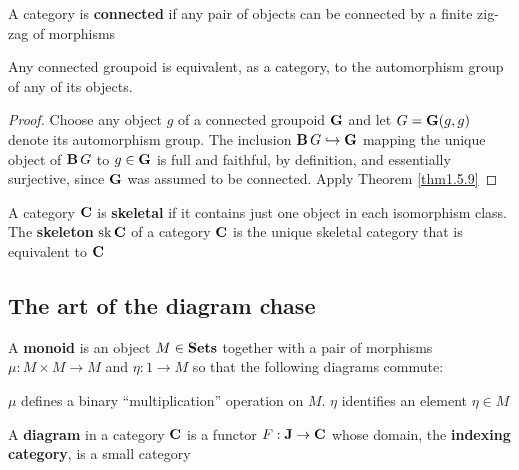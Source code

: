 \documentclass[11pt]{article}
\def \sk {\text{sk}}
\begin{document}
A category is \textbf{connected} if any pair of objects can be connected by a finite zig-zag of morphisms

\begin{proposition}[]
Any connected groupoid is equivalent, as a category, to the automorphism group of any of its objects.
\end{proposition}

\begin{proof}
Choose any object \(g\) of a connected groupoid \(\operatorname{\textbf{G}}\) and let \(G=\operatorname{\textbf{G}}(g,g)\) denote its
automorphism group. The inclusion \(\operatorname{\textbf{B}} G\hookrightarrow\operatorname{\textbf{G}}\) mapping the unique object of \(\operatorname{\textbf{B}} G\) to \(g\in\operatorname{\textbf{G}}\) is
full and faithful, by definition, and essentially surjective, since \(\operatorname{\textbf{G}}\) was assumed to be
connected. Apply Theorem \ref{thm1.5.9}
\end{proof}

\begin{definition}[]
A category \(\operatorname{\textbf{C}}\) is \textbf{skeletal} if it contains just one object in each isomorphism class. The
\textbf{skeleton} \(\sk\bC\) of a category \(\operatorname{\textbf{C}}\) is the unique skeletal category that is equivalent to \(\operatorname{\textbf{C}}\)
\end{definition}
\subsection{The art of the diagram chase}
\label{sec:orgbd3573c}
\begin{definition}[]
A \textbf{monoid} is an object \(M\in\operatorname{\textbf{Sets}}\) together with a pair of morphisms \(\mu:M\times M\to M\) and \(\eta:1\to M\)
so that the following diagrams commute:
\begin{center}\quad
{}
\end{center}
\end{definition}

\(\mu\) defines a binary ``multiplication'' operation on \(M\). \(\eta\) identifies an element \(\eta\in M\)

\begin{definition}[]
A \textbf{diagram} in a category \(\operatorname{\textbf{C}}\) is a functor \(F:\operatorname{\textbf{J}}\to\operatorname{\textbf{C}}\) whose domain, the \textbf{indexing category}, is a
small category
\end{definition}
\end{document}
